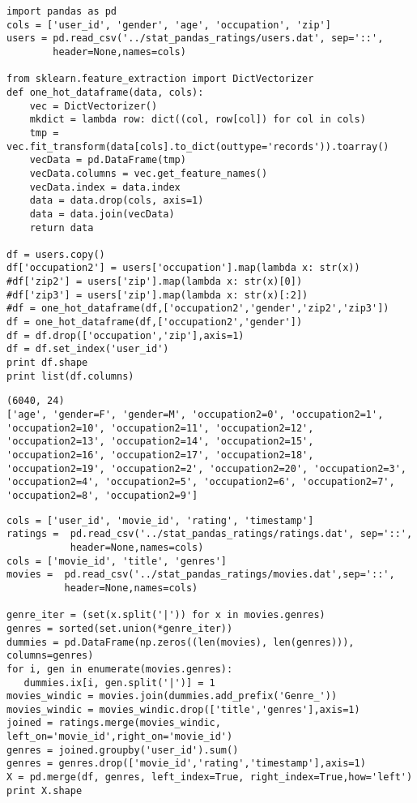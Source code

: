 \documentclass[12pt,fleqn]{article}\usepackage{../common}
\begin{document}
\begin{verbatim}
import pandas as pd
cols = ['user_id', 'gender', 'age', 'occupation', 'zip']
users = pd.read_csv('../stat_pandas_ratings/users.dat', sep='::', 
        header=None,names=cols)

from sklearn.feature_extraction import DictVectorizer
def one_hot_dataframe(data, cols):
    vec = DictVectorizer()
    mkdict = lambda row: dict((col, row[col]) for col in cols)
    tmp = vec.fit_transform(data[cols].to_dict(outtype='records')).toarray()
    vecData = pd.DataFrame(tmp)
    vecData.columns = vec.get_feature_names()
    vecData.index = data.index
    data = data.drop(cols, axis=1)
    data = data.join(vecData)
    return data

df = users.copy()
df['occupation2'] = users['occupation'].map(lambda x: str(x))
#df['zip2'] = users['zip'].map(lambda x: str(x)[0])
#df['zip3'] = users['zip'].map(lambda x: str(x)[:2])
#df = one_hot_dataframe(df,['occupation2','gender','zip2','zip3'])
df = one_hot_dataframe(df,['occupation2','gender'])
df = df.drop(['occupation','zip'],axis=1)
df = df.set_index('user_id')
print df.shape
print list(df.columns)
\end{verbatim}

\begin{verbatim}
(6040, 24)
['age', 'gender=F', 'gender=M', 'occupation2=0', 'occupation2=1', 'occupation2=10', 'occupation2=11', 'occupation2=12', 'occupation2=13', 'occupation2=14', 'occupation2=15', 'occupation2=16', 'occupation2=17', 'occupation2=18', 'occupation2=19', 'occupation2=2', 'occupation2=20', 'occupation2=3', 'occupation2=4', 'occupation2=5', 'occupation2=6', 'occupation2=7', 'occupation2=8', 'occupation2=9']
\end{verbatim}

\begin{verbatim}
cols = ['user_id', 'movie_id', 'rating', 'timestamp']
ratings =  pd.read_csv('../stat_pandas_ratings/ratings.dat', sep='::',
           header=None,names=cols)
cols = ['movie_id', 'title', 'genres']
movies =  pd.read_csv('../stat_pandas_ratings/movies.dat',sep='::',
          header=None,names=cols)

genre_iter = (set(x.split('|')) for x in movies.genres)
genres = sorted(set.union(*genre_iter))
dummies = pd.DataFrame(np.zeros((len(movies), len(genres))), columns=genres)
for i, gen in enumerate(movies.genres):
   dummies.ix[i, gen.split('|')] = 1
movies_windic = movies.join(dummies.add_prefix('Genre_'))
movies_windic = movies_windic.drop(['title','genres'],axis=1)
joined = ratings.merge(movies_windic, left_on='movie_id',right_on='movie_id')
genres = joined.groupby('user_id').sum()
genres = genres.drop(['movie_id','rating','timestamp'],axis=1)
X = pd.merge(df, genres, left_index=True, right_index=True,how='left')
print X.shape
\end{verbatim}
\end{document}
